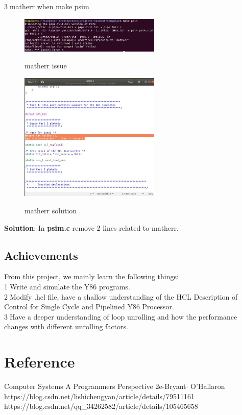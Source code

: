 \documentclass{article}
\begin{document}
\textcircled{3}matherr when make psim
\begin{figure}[H]
	\begin{minipage}[h]{\textwidth}
		\centering
		\includegraphics[width=0.6\textwidth]{problem3.jpg}
		\caption{matherr issue} \label{Fig-G16}
		\hspace{5mm}
		\includegraphics[width=0.6\textwidth]{solution3.jpg}
		\caption{matherr solution} \label{Fig-G13}
	\end{minipage}
\end{figure}
\textbf{Solution}: In \textbf{psim.c} remove 2 lines related to matherr.
\subsection{Achievements}

From this project, we mainly learn the following things:\\
\textcircled{1}Write and simulate the Y86 programs.\\
\textcircled{2}Modify .hcl file, have a shallow understanding of the HCL Description of Control for Single Cycle and Pipelined Y86 Processor.\\
\textcircled{3}Have a deeper understanding of loop unrolling and how the performance changes with different unrolling factors.

\section{Reference}
Computer Systems A Programmers Perspective 2e\quad-Bryant$\cdot$ O'Hallaron\\
https://blog.csdn.net/lishichengyan/article/details/79511161\\
https://blog.csdn.net/qq\_34262582/article/details/105465658\\
\end{document}

